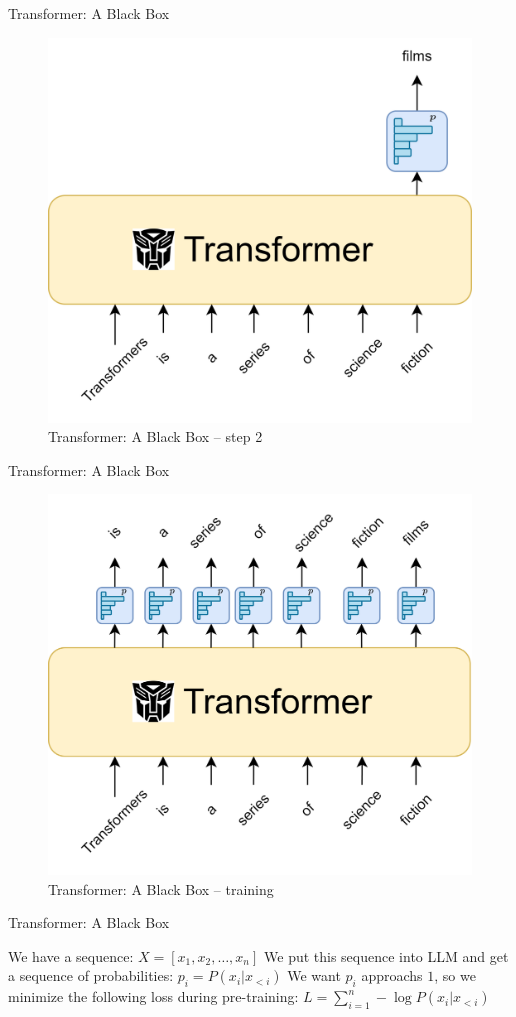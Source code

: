 \documentclass[scheme=plain]{ctexbeamer}
\begin{document}
\begin{frame}{Transformer: A Black Box}
  \begin{figure}
      \includegraphics[width=.6\linewidth]{transformer_black_box_step_2.drawio.png}
      \caption[]{Transformer: A Black Box -- step 2}
  \end{figure}
\end{frame}
\begin{frame}{Transformer: A Black Box}
  \begin{figure}
      \includegraphics[width=.6\linewidth]{transformer_black_box_step_3.drawio.png}
      \caption[]{Transformer: A Black Box -- training}
  \end{figure}
\end{frame}
\begin{frame}{Transformer: A Black Box}
  \begin{outline}
    \1 We have a sequence: $ X = [x_1, x_2, \dots, x_n ] $
    \1 We put this sequence into LLM and get a sequence of probabilities:
      \2 $p_i = P(x_i | x_{<i})$
    \1 We want $p_i$ approachs $1$, so we minimize the following loss during pre-training:
      \2 $L = \sum_{i=1}^{n} - \log P(x_i | x_{<i})$
  \end{outline}
\end{frame}
\end{document}
